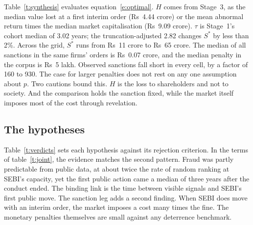 \documentclass[letterpaper,11pt,leqno]{article}
\begin{document}
Table~\ref{t:synthesis} evaluates equation~\eqref{e:optimal}. $H$ comes from Stage~3, as the median value lost at a first interim order (Rs~4.44 crore) or the mean abnormal return times the median market capitalisation (Rs~9.09 crore). $\tau$ is Stage~1's cohort median of 3.02 years; the truncation-adjusted 2.82 changes $S^{*}$ by less than 2\%. Across the grid, $S^{*}$ runs from Rs~11 crore to Rs~65 crore. The median of all sanctions in the same firms' orders is Rs~0.07 crore, and the median penalty in the corpus is Rs~5 lakh. Observed sanctions fall short in every cell, by a factor of 160 to 930. The case for larger penalties does not rest on any one assumption about $p$. Two cautions bound this. $H$ is the loss to shareholders and not to society. And the comparison holds the sanction fixed, while the market itself imposes most of the cost through revelation.

\begin{table}[htb]
\caption{The implied optimal penalty $S^{*} = (H/p)\,e^{r\tau}$, Rs crore}

\label{t:synthesis}\end{table}

\subsection{The hypotheses}\label{s:verdicts}

Table~\ref{t:verdicts} sets each hypothesis against its rejection criterion. In the terms of table~\ref{t:joint}, the evidence matches the second pattern. Fraud was partly predictable from public data, at about twice the rate of random ranking at SEBI's capacity, yet the first public action came a median of three years after the conduct ended. The binding link is the time between visible signals and SEBI's first public move. The sanction leg adds a second finding. When SEBI does move with an interim order, the market imposes a cost many times the fine. The monetary penalties themselves are small against any deterrence benchmark.
\end{document}
